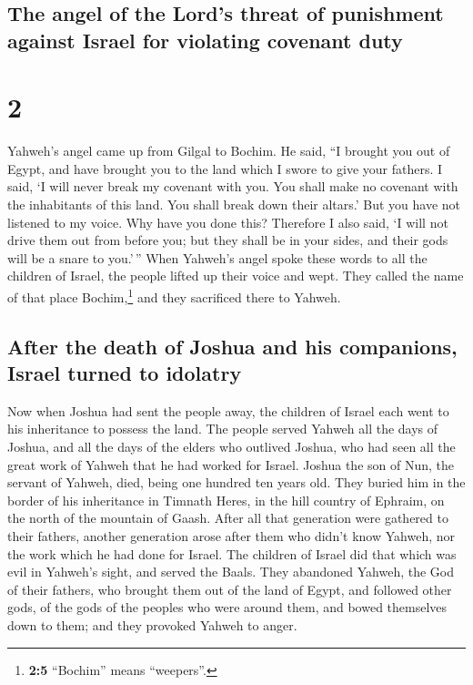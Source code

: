 \hypertarget{the-angel-of-the-lords-threat-of-punishment-against-israel-for-violating-covenant-duty}{%
\subsection{The angel of the Lord's threat of punishment against Israel
for violating covenant
duty}\label{the-angel-of-the-lords-threat-of-punishment-against-israel-for-violating-covenant-duty}}

\hypertarget{section-1}{%
\section{2}\label{section-1}}

 Yahweh's angel came up from Gilgal to Bochim. He said,
``I brought you out of Egypt, and have brought you to the land which I
swore to give your fathers. I said, `I will never break my covenant with
you.  You shall make no covenant with the inhabitants of
this land. You shall break down their altars.' But you have not listened
to my voice. Why have you done this?  Therefore I also
said, `I will not drive them out from before you; but they shall be in
your sides, and their gods will be a snare to you.'\,'' 
When Yahweh's angel spoke these words to all the children of Israel, the
people lifted up their voice and wept.  They called the
name of that place Bochim,\footnote{\textbf{2:5} ``Bochim'' means
  ``weepers''.} and they sacrificed there to Yahweh.

\hypertarget{after-the-death-of-joshua-and-his-companions-israel-turned-to-idolatry}{%
\subsection{After the death of Joshua and his companions, Israel turned
to
idolatry}\label{after-the-death-of-joshua-and-his-companions-israel-turned-to-idolatry}}

 Now when Joshua had sent the people away, the children of
Israel each went to his inheritance to possess the land. 
The people served Yahweh all the days of Joshua, and all the days of the
elders who outlived Joshua, who had seen all the great work of Yahweh
that he had worked for Israel.  Joshua the son of Nun, the
servant of Yahweh, died, being one hundred ten years old. 
They buried him in the border of his inheritance in Timnath Heres, in
the hill country of Ephraim, on the north of the mountain of Gaash.
 After all that generation were gathered to their
fathers, another generation arose after them who didn't know Yahweh, nor
the work which he had done for Israel.  The children of
Israel did that which was evil in Yahweh's sight, and served the Baals.
 They abandoned Yahweh, the God of their fathers, who
brought them out of the land of Egypt, and followed other gods, of the
gods of the peoples who were around them, and bowed themselves down to
them; and they provoked Yahweh to anger.

